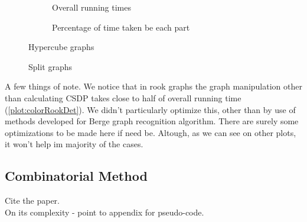 \begin{figure}
  \begin{subfigure}{.5\textwidth}
    \centering
    
    \caption{Overall running times}
  \end{subfigure}%
  \begin{subfigure}{.5\textwidth}
    \centering
    
    \caption{Percentage of time taken be each part}
  \end{subfigure}
  \caption{Hypercube graphs}
\end{figure}

\begin{figure}
  \caption{Split graphs}
\end{figure}

A few things of note. We notice that in rook graphs the graph manipulation other than calculating CSDP takes close to half of overall running time (\cref{plot:colorRookDet}). We didn't particularly optimize this, other than by use of methods developed for Berge graph recognition algorithm. There are surely some optimizations to be made here if need be. Altough, as we can see on other plots, it won't help im majority of the cases.


\subsection{Combinatorial Method}

Cite the paper.\\

On its complexity - point to appendix for pseudo-code.